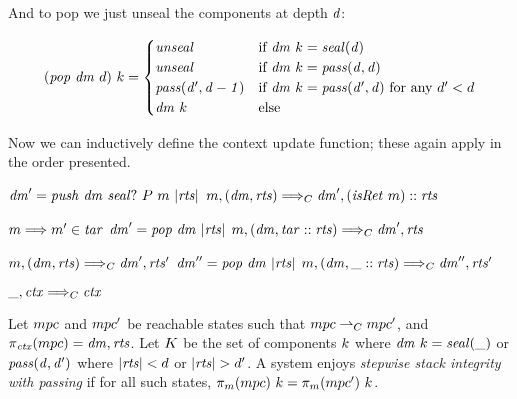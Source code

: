 \documentclass[acmsmall,review,anonymous]{acmart}\settopmatter{printfolios=true,printccs=false,printacmref=false}
\begin{document}
And to pop we just unseal the components at depth \(d\):

\[(\mathit{pop} ~ \mathit{dm} ~ d) ~ k =
\begin{cases}
  \mathit{unseal}                 & \text{if } \mathit{dm} ~ k = \mathit{seal(d)} \\
  \mathit{unseal}                 & \text{if } \mathit{dm} ~ k = \mathit{pass(d,d)} \\
  \mathit{pass(d',d-1)} & \text{if } \mathit{dm} ~ k = \mathit{pass(d',d)}
                              \text{ for any } d' < d \\
  \mathit{dm}~k        & \text{else} \\
\end{cases}\]

Now we can inductively define the context update function; these again apply in the order
presented.

            {\(\mathit{dm}' = \mathit{push} ~ \mathit{dm} ~ \mathit{seal?} ~ P ~ m ~ |\mathit{rts}|\)}
            {\(m,(\mathit{dm},\mathit{rts}) \Longrightarrow_C \mathit{dm}',(\mathit{isRet} ~ m)::\mathit{rts}\)}

\judgmentthree[ReturnFound]
              {\(\codemap ~ (\mach ~ \PCname) = \retmap\)}
              {\(m \Longrightarrow m' \in \mathit{tar}\)}
              {\(\mathit{dm}' = \mathit{pop} ~ \mathit{dm} ~ |\mathit{rts}|\)}
              {\(m,(\mathit{dm},\mathit{tar}::\mathit{rts}) \Longrightarrow_C \mathit{dm}',\mathit{rts}\)}

\judgmentthree[ReturnRec]
              {\(\codemap ~ (\mach ~ \PCname) = \retmap\)}
              {\(m,(\mathit{dm},\mathit{rts}) \Longrightarrow_C \mathit{dm}',\mathit{rts}'\)}
              {\(\mathit{dm}'' = \mathit{pop} ~ \mathit{dm} ~ |\mathit{rts}|\)}
              {\(m,(\mathit{dm},\_::\mathit{rts}) \Longrightarrow_C \mathit{dm}'',\mathit{rts}'\)}

\judgment[Default]
         {}
         {\(\_,\mathit{ctx} \Longrightarrow_C \mathit{ctx}\)}

 Let \(mpc\) and \(mpc'\) be reachable states such that
\(mpc \overset{}{\rightharpoonup}_C mpc'\), and \(\pi_{\mathit{ctx}}(mpc) = \mathit{dm},\mathit{rts}\).
Let \(K\) be the set of components \(k\) where
\(\mathit{dm} ~ k = \mathit{seal(\_)}\) or \(\mathit{pass(d,d')}\) where \(|\mathit{rts}| < d\)
or \(|\mathit{rts}| > d'\). A system enjoys {\em stepwise stack integrity with passing} if for all
such states, \(\pi_m(mpc) ~ k = \pi_m(mpc') ~ k\).
\end{document}
